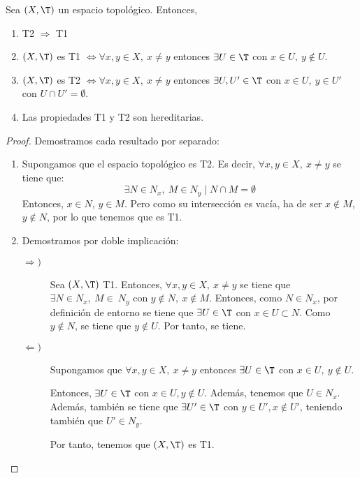 \begin{prop} Sea $(X,\T)$ un espacio topológico. Entonces,
    \begin{enumerate}
        \item T2 $\Longrightarrow$ T1
        \item $(X,\T)$ es T1 $\Longleftrightarrow \forall x,y\in X,~x\neq y$ entonces $\exists U\in \T$ con $x\in U,~y\notin U$.
        \item $(X,\T)$ es T2 $\Longleftrightarrow \forall x,y\in X,~x\neq y$ entonces $\exists U,U'\in \T$ con $x\in U,~y\in U'$ con $U\cap U'=\emptyset$.
        \item Las propiedades T1 y T2 son hereditarias.
    \end{enumerate}
\end{prop}
\begin{proof}Demostramos cada resultado por separado:
    \begin{enumerate}
        \item Supongamos que el espacio topológico es T2. Es decir, $\forall x,y\in X,~x\neq y$ se tiene que:
        \begin{equation*}
            \exists N\in N_x,~M\in N_y \mid N\cap M=\emptyset
        \end{equation*}
        Entonces, $x\in N$, $y\in M$. Pero como su intersección es vacía, ha de ser $x\notin M$, $y\notin N$, por lo que tenemos que es T1.

        \item Demostramos por doble implicación:
        \begin{description}
            \item[$\Longrightarrow)$] Sea $(X,\T)$ T1. Entonces, $\forall x,y\in X,~x\neq y$ se tiene que $\exists N\in N_x,~M\in~N_y$ con $y\notin N,~x\notin M$. Entonces, como $N\in N_x$, por definición de entorno se tiene que $\exists U\in \T$ con $x\in U\subset N$. Como $y\notin N$, se tiene que $y\notin U$. Por tanto, se tiene.

            \item[$\Longleftarrow)$] Supongamos que  $\forall x,y\in X,~x\neq y$ entonces $\exists U\in \T$ con $x\in U,~y\notin U$.
            
            Entonces, $\exists U\in \T$ con $x\in U, y\notin U$. Además, tenemos que $U\in N_x$. Además, también se tiene que $\exists U'\in \T$ con $y\in U',x\notin U'$, teniendo también que $U'\in N_y$.
            
            Por tanto, tenemos que $(X,\T)$ es T1.
        \end{description}


\end{enumerate}
\end{proof}
